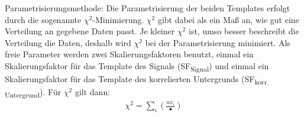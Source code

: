 Parametrisierungsmethode:
Die Parametrisierung der beiden Templates erfolgt durch die sogenannte $\chi^{2}$-Minimierung.
$\chi^{2}$ gibt dabei als ein Ma{\ss} an, wie gut eine Verteilung an gegebene Daten passt.
Je kleiner $\chi^{2}$ ist, umso besser beschreibt die Verteilung die Daten, deshalb wird $\chi^{2}$ bei der Parametrisierung minimiert.
Als freie Parameter werden zwei Skalierungsfaktoren benutzt, einmal ein Skalierungsfaktor f\"ur das Template des Signals (SF\textsubscript{Signal}) und einmal ein Skalierungsfaktor f\"ur das Template des korrelierten Untergrunds (SF\textsubscript{korr. Untergrund}).
F\"ur $\chi^{2}$ gilt dann:
\begin{align}
\chi^{2} = \sum_{i}\left(\frac{ax_{i}}{•}\right)
\end{align}